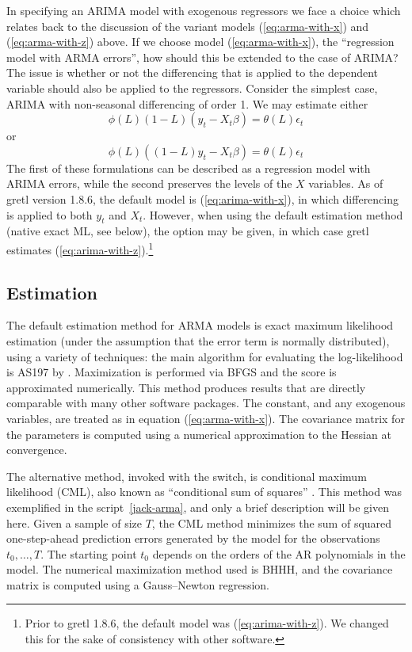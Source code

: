In specifying an ARIMA model with exogenous regressors we face a
choice which relates back to the discussion of the variant models
(\ref{eq:arma-with-x}) and (\ref{eq:arma-with-z}) above.  If we choose
model (\ref{eq:arma-with-x}), the ``regression model with ARMA
errors'', how should this be extended to the case of ARIMA?  The issue
is whether or not the differencing that is applied to the dependent
variable should also be applied to the regressors.  Consider the
simplest case, ARIMA with non-seasonal differencing of order 1. We may
estimate either
\begin{equation}
  \label{eq:arima-with-x}
  \phi(L) (1-L) (y_t - X_t\beta) = \theta(L) \epsilon_t
\end{equation}
or
\begin{equation}
  \label{eq:arima-with-z}
  \phi(L) \left((1-L) y_t - X_t\beta\right) = \theta(L) \epsilon_t
\end{equation}
%
The first of these formulations can be described as a regression model
with ARIMA errors, while the second preserves the levels of the $X$
variables.  As of gretl version 1.8.6, the default model is
(\ref{eq:arima-with-x}), in which differencing is applied to both
$y_t$ and $X_t$.  However, when using the default estimation method
(native exact ML, see below), the option  may be
given, in which case gretl estimates
(\ref{eq:arima-with-z}).\footnote{Prior to gretl 1.8.6, the
  default model was (\ref{eq:arima-with-z}).  We changed this for the
  sake of consistency with other software.}

\subsection{Estimation}
\label{arma-est}

The default estimation method for ARMA models is exact maximum
likelihood estimation (under the assumption that the error term is
normally distributed), using a variety of techniques: the main
algorithm for evaluating the log-likelihood is AS197 by
\cite{melard84}. Maximization is performed via BFGS and the score is
approximated numerically.  This method produces results that are
directly comparable with many other software packages.  The constant,
and any exogenous variables, are treated as in equation
(\ref{eq:arma-with-x}).  The covariance matrix for the parameters is
computed using a numerical approximation to the Hessian at
convergence.

The alternative method, invoked with the  switch,
is conditional maximum likelihood (CML), also known as ``conditional
sum of squares'' \citep[see][p.\ 132]{hamilton94}.  This method was
exemplified in the script~\ref{jack-arma}, and only a brief
description will be given here.  Given a sample of size $T$, the CML
method minimizes the sum of squared one-step-ahead prediction errors
generated by the model for the observations $t_0, \ldots, T$.  The
starting point $t_0$ depends on the orders of the AR polynomials in
the model.  The numerical maximization method used is BHHH, and the
covariance matrix is computed using a Gauss--Newton regression.

